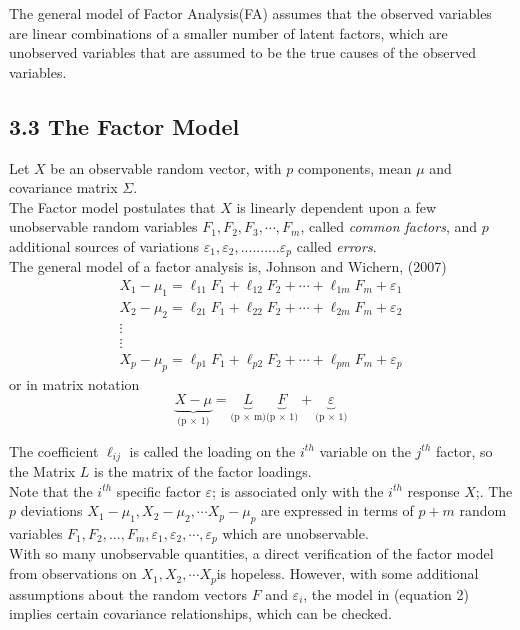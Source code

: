 \documentclass[12pt]{article}
\begin{document}
\noindent The general model of Factor Analysis(FA) assumes that the observed variables are linear combinations of a smaller number of latent factors, which are unobserved variables that are assumed to be the true causes of the observed variables.\\


\subsection*{3.3 The Factor Model}
Let $X$ be an observable random vector, with $p$ components, mean $\mu$ and covariance matrix $\Sigma$. \\
\noindent The Factor model postulates that $X$ is linearly dependent upon a few unobservable random variables $F_1, F_2, F_3, \cdots, F_m$, called \emph{common factors}, and $p$ additional sources of variations $\varepsilon_1, \varepsilon_2, ..........\varepsilon_p$ called \emph{errors}.\\
\noindent The general model of a factor analysis is, Johnson and Wichern, (2007)
\begin{equation}
	\begin{gathered}
		X_1-\mu_1=\ell_{11} F_1+\ell_{12} F_2+\cdots+\ell_{1 m} F_m+\varepsilon_1 \\
		X_2-\mu_2=\ell_{21} F_1+\ell_{22} F_2+\cdots+\ell_{2 m} F_m+\varepsilon_2 \\
		\vdots \\
		\vdots \\
		X_p-\mu_p=\ell_{p 1} F_1+\ell_{p 2} F_2+\cdots+\ell_{p m} F_m+\varepsilon_p
	\end{gathered}
\end{equation}
or in matrix notation
\begin{equation}
	\underbrace{X- \mu}_\text{(p $\times$ 1)}=\underbrace{L}_\text{(p $\times$ m)} \underbrace{F}_\text{(p $\times$ 1)} + \underbrace{\varepsilon}_\text{(p $\times$ 1)}
\end{equation}


\noindent The coefficient $\ell_{ij}$ is called the loading on the $i^{th}$ variable on the $j^{th}$ factor, so the Matrix $L$ is the matrix of the factor loadings. \\
Note that the $i^{th}$ specific factor $\varepsilon$; is associated only 
with the $i^{th}$ response $X$;. The $p$ deviations $X_1 - \mu_1,  X_2- \mu_2, \cdots X_p- \mu_p$  are expressed in terms of $p + m$ random variables $F_1 ,F_2, ... , F_m, \varepsilon_1, \varepsilon_2,\cdots , \varepsilon_p$ which are unobservable. \\
\noindent With so many unobservable quantities, a direct verification of the factor model from observations on $X_1, X_2,\cdots X_p $is hopeless. However, with some additional assumptions about the random vectors $F$ and $\varepsilon_i$, the model in (equation 2) implies certain covariance relationships, which can be checked. 
\end{document}
